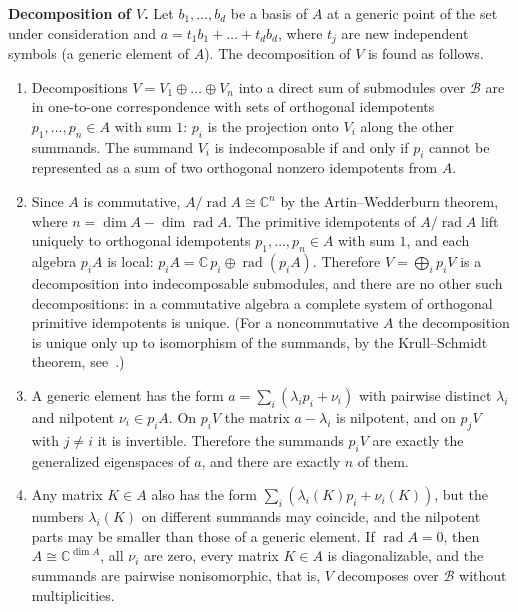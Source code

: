 \documentclass[12pt,a4paper]{article}
\begin{document}
\textbf{Decomposition of $V$.} Let $b_1,\dots,b_d$ be a basis of $A$ at a generic point of the set under consideration and
$a=t_1b_1+\dots+t_db_d$, where $t_j$ are new independent symbols (a generic element of $A$). The decomposition of $V$ is found as follows.
\begin{enumerate}
\item Decompositions $V=V_1\oplus\dots\oplus V_n$ into a direct sum of submodules over $\mathcal B$ are in one-to-one
correspondence with sets of orthogonal idempotents $p_1,\dots,p_n\in A$ with sum $1$: $p_i$ is the projection onto $V_i$ along
the other summands. The summand $V_i$ is indecomposable if and only if $p_i$ cannot be represented as a sum of
two orthogonal nonzero idempotents from $A$.
\item Since $A$ is commutative, $A/\operatorname{rad}A\cong\mathbb C^n$ by the Artin--Wedderburn theorem, where $n=\dim A-\dim\operatorname{rad}A$.
The primitive idempotents of $A/\operatorname{rad}A$ lift uniquely to orthogonal idempotents
$p_1,\dots,p_n\in A$ with sum $1$, and each algebra $p_iA$ is local: $p_iA=\mathbb C\,p_i\oplus\operatorname{rad}(p_iA)$.
Therefore $V=\bigoplus_ip_iV$ is a decomposition into indecomposable submodules, and there are no other such decompositions: in a commutative
algebra a complete system of orthogonal primitive idempotents is unique. (For a noncommutative $A$ the decomposition is
unique only up to isomorphism of the summands, by the Krull--Schmidt theorem, see~\cite[\S3.8]{EGH}.)
\item A generic element has the form $a=\sum_i(\lambda_ip_i+\nu_i)$ with pairwise distinct $\lambda_i$ and nilpotent
$\nu_i\in p_iA$. On $p_iV$ the matrix $a-\lambda_i$ is nilpotent, and on $p_jV$ with $j\neq i$ it is invertible. Therefore the summands
$p_iV$ are exactly the generalized eigenspaces of $a$, and there are exactly $n$ of them.
\item Any matrix $K\in A$ also has the form $\sum_i(\lambda_i(K)p_i+\nu_i(K))$, but the numbers $\lambda_i(K)$ on different
summands may coincide, and the nilpotent parts may be smaller than those of a generic element. If
$\operatorname{rad}A=0$, then $A\cong\mathbb C^{\dim A}$, all $\nu_i$ are zero, every
matrix $K\in A$ is diagonalizable, and the summands are pairwise nonisomorphic, that is, $V$ decomposes over $\mathcal B$ without
multiplicities.
\end{enumerate}
\end{document}
